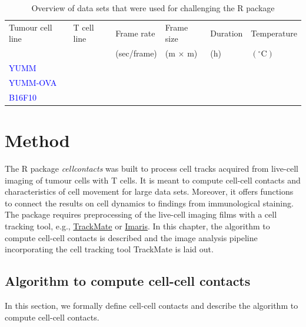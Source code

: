 \documentclass{report}
\newcommand{\tu}{\textmu}
\begin{document}
\begin{table}[h!]
\centering
\caption[Data sets to challenge the work flow]{Overview of data sets that were used for challenging the R package} \label{Datasets_challenging}

\begin{tabular}{ P{2.5cm} P{2.5cm}  P{2cm} P{2cm} P{2cm} P{2cm}} 
Tumour cell line 	& T cell line	& Frame rate & Frame size &  Duration & Temperature\\
					& 				& (sec/frame)&(\tu m $\times$ \tu m) & (h) & $(^\circ \text{C})$\\ \midrule
\textcolor{blue}{YUMM} &  				&  &   &  &  \\[10pt]
\textcolor{blue}{YUMM-OVA} &  				&  &   &  &  \\[10pt]
\textcolor{blue}{B16F10} &  				&  &   &  &  \\[10pt]
\end{tabular}

\end{table}

\chapter{Method}

The R package \textit{cellcontacts} was built to process cell tracks acquired from live-cell imaging of tumour cells with T cells. It is meant to compute cell-cell contacts and characteristics of cell movement for large data sets. Moreover, it offers functions to connect the results on cell dynamics to findings from immunological staining. The package requires preprocessing of the live-cell imaging films with a cell tracking tool, e.g., \href{https://imagej.net/plugins/trackmate/}{TrackMate} or \href{https://imaris.oxinst.com/products/imaris-for-tracking}{Imaris}. In this chapter, the algorithm to compute cell-cell contacts is described and the image analysis pipeline incorporating the cell tracking tool TrackMate is laid out.

\section{Algorithm to compute cell-cell contacts}

In this section, we formally define cell-cell contacts and describe the algorithm to compute cell-cell contacts.
\end{document}
